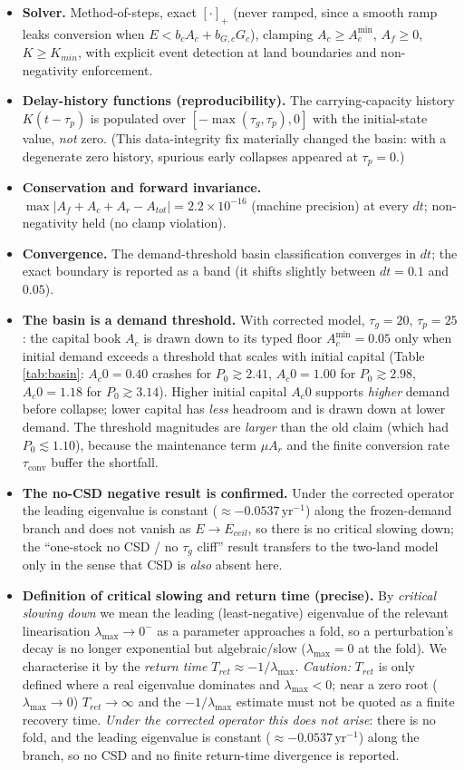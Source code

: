 \documentclass[11pt]{article}
\begin{document}
\begin{itemize}
\item \textbf{Solver.} Method-of-steps, exact $[\cdot]_+$ (never ramped, since a smooth ramp leaks conversion when $E<b_cA_c+b_{G,c}G_c$), clamping $A_c\ge A_c^{\min}$, $A_f\ge0$, $K\ge K_{min}$, with explicit event detection at land boundaries and non-negativity enforcement.
\item \textbf{Delay-history functions (reproducibility).} The carrying-capacity history $K(t-\tau_p)$ is populated over $[-\max(\tau_g,\tau_p),0]$ with the initial-state value, \emph{not} zero. (This data-integrity fix materially changed the basin: with a degenerate zero history, spurious early collapses appeared at $\tau_p=0$.)
\item \textbf{Conservation and forward invariance.} $\max|A_f+A_c+A_r-A_{tot}|=2.2\times10^{-16}$ (machine precision) at every $dt$; non-negativity held (no clamp violation).
\item \textbf{Convergence.} The demand-threshold basin classification converges in $dt$; the exact boundary is reported as a band (it shifts slightly between $dt=0.1$ and $0.05$).
\item \textbf{The basin is a demand threshold.} With corrected model, $\tau_g=20$, $\tau_p=25$: the capital book $A_c$ is drawn down to its typed floor $A_c^{\min}=0.05$ only when initial demand exceeds a threshold that scales with initial capital (Table \ref{tab:basin}: $A_c0=0.40$ crashes for $P_0\gtrsim2.41$, $A_c0=1.00$ for $P_0\gtrsim2.98$, $A_c0=1.18$ for $P_0\gtrsim3.14$). Higher initial capital $A_c0$ supports \emph{higher} demand before collapse; lower capital has \emph{less} headroom and is drawn down at lower demand. The threshold magnitudes are \emph{larger} than the old claim (which had $P_0\lesssim1.10$), because the maintenance term $\mu A_r$ and the finite conversion rate $\tau_{\mathrm{conv}}$ buffer the shortfall.
\item \textbf{The no-CSD negative result is confirmed.} Under the corrected operator the leading eigenvalue is constant ($\approx-0.0537\,\text{yr}^{-1}$) along the frozen-demand branch and does not vanish as $E\to E_{ceil}$, so there is no critical slowing down; the ``one-stock no CSD / no $\tau_g$ cliff'' result transfers to the two-land model only in the sense that CSD is \emph{also} absent here.
\item \textbf{Definition of critical slowing and return time (precise).} By \emph{critical slowing down} we mean the leading (least-negative) eigenvalue of the relevant linearisation $\lambda_{\max}\to0^-$ as a parameter approaches a fold, so a perturbation's decay is no longer exponential but algebraic/slow ($\lambda_{\max}=0$ at the fold). We characterise it by the \emph{return time} $T_{ret}\approx-1/\lambda_{\max}$. \emph{Caution:} $T_{ret}$ is only defined where a real eigenvalue dominates and $\lambda_{\max}<0$; near a zero root ($\lambda_{\max}\to0$) $T_{ret}\to\infty$ and the $-1/\lambda_{\max}$ estimate must not be quoted as a finite recovery time. \emph{Under the corrected operator this does not arise}: there is no fold, and the leading eigenvalue is constant ($\approx-0.0537\,\text{yr}^{-1}$) along the branch, so no CSD and no finite return-time divergence is reported.

\end{itemize}
\end{document}
